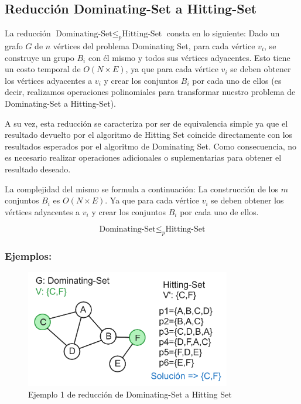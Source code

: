 \subsection{Reducción Dominating-Set a Hitting-Set}

La reducción $\text{Dominating-Set} \leq_{p} \text{Hitting-Set}$ consta en lo siguiente:
Dado un grafo $G$ de $n$ vértices del problema Dominating Set, para cada vértice $v_{i}$, se construye un grupo $B_{i}$ con él mismo y todos sus vértices adyacentes. Esto tiene un costo temporal de $O(N \times E)$, ya que para cada vértice $v_{i}$ se deben obtener los vértices adyacentes a $v_{i}$ y crear los conjuntos $B_{i}$ por cada uno de ellos (es decir, realizamos operaciones polinomiales para transformar nuestro problema de Dominating-Set a Hitting-Set). 

A su vez, esta reducción se caracteriza por ser de equivalencia simple ya que el resultado devuelto por el algoritmo de Hitting Set coincide directamente con los resultados esperados por el algoritmo de Dominating Set. Como consecuencia, no es necesario realizar operaciones adicionales o suplementarias para obtener el resultado deseado.


La complejidad del mismo se formula a continuación:
La construcción de los $m$ conjuntos $B_{i}$ es $O(N \times E)$. Ya que para cada vértice $v_{i}$ se deben obtener los vértices adyacentes a $v_{i}$ y crear los conjuntos $B_{i}$ por cada uno de ellos. 

\[\text{Dominating-Set}  \leq _{p} \text{Hitting-Set}\]

\subsubsection{Ejemplos:} 

\begin{figure}[H]
    \centering
    \includegraphics[width=0.8\textwidth]{img/ejemplo1_DS-HS.png}
    \caption{Ejemplo 1 de reducción de Dominating-Set a Hitting Set}
    \label{fig:ejemplo1_DS-HS}
\end{figure}


